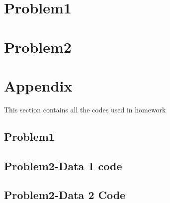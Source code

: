 \documentclass[12pt]{article}
\begin{document}

\tableofcontents
\pagebreak


\section{Problem1}
\section{Problem2}
\section{Appendix}

This section contains all the codes used in homework

\subsection{Problem1}
%

\subsection{Problem2-Data 1 code}
%

\subsection{Problem2-Data 2 Code}


%

\begin{lstlisting}
\end{lstlisting}
\end{document}
